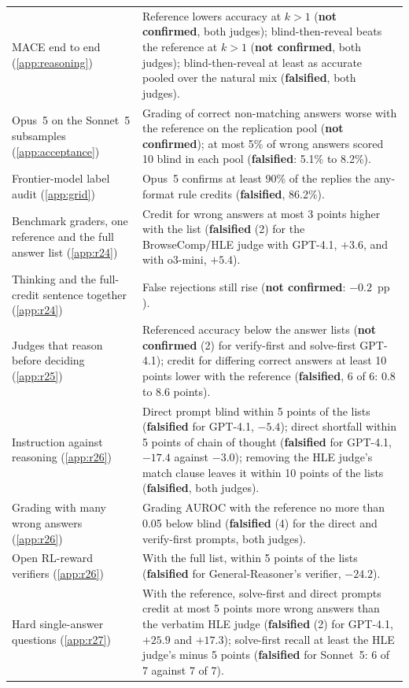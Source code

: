 {\begin{longtable}{L{3.5cm}L{9.5cm}}
\textsc{MACE} end to end (\cref{app:reasoning}) & Reference lowers accuracy at $k{>}1$ (\textbf{not confirmed}, both judges); blind-then-reveal beats the reference at $k{>}1$ (\textbf{not confirmed}, both judges); blind-then-reveal at least as accurate pooled over the natural mix (\textbf{falsified}, both judges). \\
Opus~5 on the Sonnet~5 subsamples (\cref{app:acceptance}) & Grading of correct non-matching answers worse with the reference on the replication pool (\textbf{not confirmed}); at most 5\% of wrong answers scored 10 blind in each pool (\textbf{falsified}: 5.1\% to 8.2\%). \\
Frontier-model label audit (\cref{app:grid}) & Opus~5 confirms at least 90\% of the replies the any-format rule credits (\textbf{falsified}, 86.2\%). \\
Benchmark graders, one reference and the full answer list (\cref{app:r24}) & Credit for wrong answers at most 3 points higher with the list (\textbf{falsified} (2) for the BrowseComp/HLE judge with GPT-4.1, $+3.6$, and with o3-mini, $+5.4$). \\
Thinking and the full-credit sentence together (\cref{app:r24}) & False rejections still rise (\textbf{not confirmed}: $-0.2$~pp ). \\
Judges that reason before deciding (\cref{app:r25}) & Referenced accuracy below the answer lists (\textbf{not confirmed} (2) for verify-first and solve-first GPT-4.1); credit for differing correct answers at least 10 points lower with the reference (\textbf{falsified}, 6 of 6: 0.8 to 8.6 points). \\
Instruction against reasoning (\cref{app:r26}) & Direct prompt blind within 5 points of the lists (\textbf{falsified} for GPT-4.1, $-5.4$); direct shortfall within 5 points of chain of thought (\textbf{falsified} for GPT-4.1, $-17.4$ against $-3.0$); removing the HLE judge's match clause leaves it within 10 points of the lists (\textbf{falsified}, both judges). \\
Grading with many wrong answers (\cref{app:r26}) & Grading AUROC with the reference no more than 0.05 below blind (\textbf{falsified} (4) for the direct and verify-first prompts, both judges). \\
Open RL-reward verifiers (\cref{app:r26}) & With the full list, within 5 points of the lists (\textbf{falsified} for General-Reasoner's verifier, $-24.2$). \\
Hard single-answer questions (\cref{app:r27}) & With the reference, solve-first and direct prompts credit at most 5 points more wrong answers than the verbatim HLE judge (\textbf{falsified} (2) for GPT-4.1, $+25.9$ and $+17.3$); solve-first recall at least the HLE judge's minus 5 points (\textbf{falsified} for Sonnet~5: 6 of 7 against 7 of 7). \\
\end{longtable}
}

